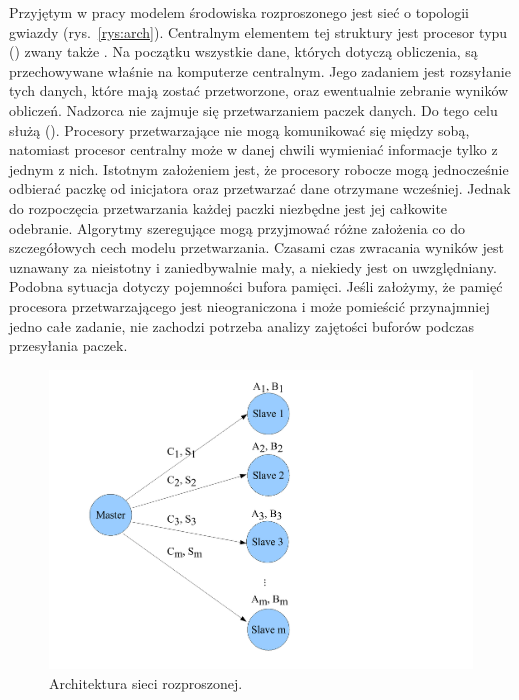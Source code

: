 Przyjętym w pracy modelem środowiska rozproszonego jest sieć o topologii gwiazdy (rys.~\vref{rys:arch}). Centralnym elementem tej struktury jest procesor typu 
 () zwany także . Na początku wszystkie dane, których dotyczą obliczenia, są przechowywane
właśnie na komputerze centralnym.
Jego zadaniem jest rozsyłanie tych danych, które mają zostać przetworzone, oraz ewentualnie zebranie wyników obliczeń. Nadzorca nie zajmuje się przetwarzaniem 
paczek danych. Do tego celu służą  (). Procesory przetwarzające nie mogą komunikować się między sobą, natomiast 
procesor centralny może w danej chwili wymieniać informacje tylko z jednym z nich. Istotnym założeniem jest, że procesory robocze mogą jednocześnie odbierać 
paczkę od inicjatora oraz przetwarzać dane otrzymane wcześniej. Jednak do rozpoczęcia przetwarzania każdej paczki niezbędne jest jej całkowite odebranie.
Algorytmy szeregujące mogą przyjmować różne założenia co do szczegółowych cech modelu przetwarzania. Czasami czas zwracania wyników jest 
uznawany za nieistotny i zaniedbywalnie mały, a niekiedy jest on uwzględniany. Podobna sytuacja dotyczy pojemności bufora pamięci. Jeśli 
założymy, że pamięć procesora przetwarzającego jest nieograniczona i może pomieścić przynajmniej jedno całe zadanie, 
nie zachodzi potrzeba analizy zajętości buforów podczas przesyłania paczek.

\begin{figure}[hbt]
\centering%
\includegraphics[scale=0.4]{figures/architektura.pdf}
\caption{Architektura sieci rozproszonej.}\label{rys:arch}
\end{figure}

